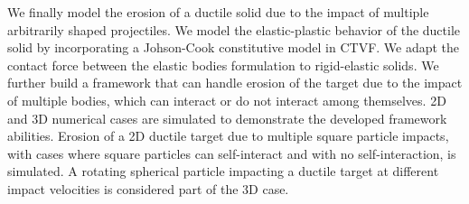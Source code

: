 \begin{Abstract}
  We finally model the erosion of a ductile solid due to the impact of multiple
  arbitrarily shaped projectiles. We model the elastic-plastic behavior of the
  ductile solid by incorporating a Johson-Cook constitutive model in CTVF. We
  adapt the contact force between the elastic bodies formulation to
  rigid-elastic solids. We further build a framework that can handle erosion of
  the target due to the impact of multiple bodies, which can interact or do not
  interact among themselves. 2D and 3D numerical cases are simulated to
  demonstrate the developed framework abilities. Erosion of a 2D ductile target
  due to multiple square particle impacts, with cases where square particles can
  self-interact and with no self-interaction, is simulated. A rotating spherical
  particle impacting a ductile target at different impact velocities is
  considered part of the 3D case.

%
%
%
%
%
\end{Abstract}
